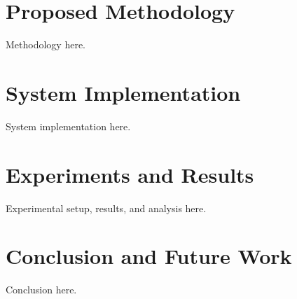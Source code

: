 \documentclass[10pt,conference]{IEEEtran}
\begin{document}
\section{Proposed Methodology}
\label{sec:method}
Methodology here.

\section{System Implementation}
\label{sec:implementation}
System implementation here.

\section{Experiments and Results}
\label{sec:experiments}
Experimental setup, results, and analysis here.

\section{Conclusion and Future Work}
\label{sec:conclusion}
Conclusion here.



\end{document}
